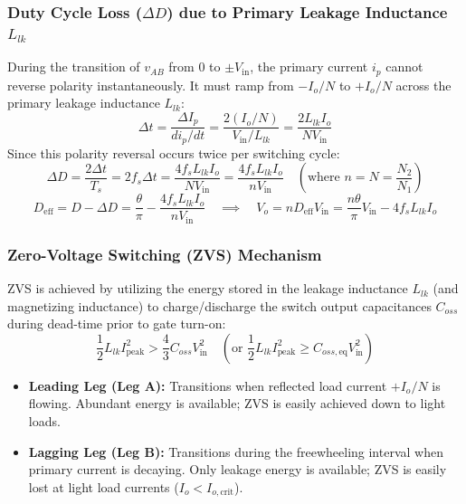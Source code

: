 \subsubsection{Duty Cycle Loss ($\Delta D$) due to Primary Leakage Inductance $L_{lk}$}
During the transition of $v_{AB}$ from $0$ to $\pm V_{\mathrm{in}}$, the primary current $i_p$ cannot reverse polarity instantaneously. It must ramp from $-I_o / N$ to $+I_o / N$ across the primary leakage inductance $L_{lk}$:
\[
\Delta t = \frac{\Delta I_p}{di_p/dt} = \frac{2 (I_o / N)}{V_{\mathrm{in}} / L_{lk}} = \frac{2 L_{lk} I_o}{N V_{\mathrm{in}}}
\]
Since this polarity reversal occurs twice per switching cycle:
\begin{equation}
\Delta D = \frac{2 \Delta t}{T_s} = 2 f_s \Delta t = \frac{4 f_s L_{lk} I_o}{N V_{\mathrm{in}}} = \frac{4 f_s L_{lk} I_o}{n V_{\mathrm{in}}} \quad \left(\text{where } n = N = \frac{N_2}{N_1}\right)
\end{equation}
\begin{equation}
D_{\mathrm{eff}} = D - \Delta D = \frac{\theta}{\pi} - \frac{4 f_s L_{lk} I_o}{n V_{\mathrm{in}}} \quad\implies\quad V_o = n D_{\mathrm{eff}} V_{\mathrm{in}} = \frac{n \theta}{\pi} V_{\mathrm{in}} - 4 f_s L_{lk} I_o
\end{equation}

\subsubsection{Zero-Voltage Switching (ZVS) Mechanism}
ZVS is achieved by utilizing the energy stored in the leakage inductance $L_{lk}$ (and magnetizing inductance) to charge/discharge the switch output capacitances $C_{oss}$ during dead-time prior to gate turn-on:
\begin{equation}
\frac{1}{2} L_{lk} I_{\mathrm{peak}}^2 > \frac{4}{3} C_{oss} V_{\mathrm{in}}^2 \quad \left(\text{or } \frac{1}{2} L_{lk} I_{\mathrm{peak}}^2 \ge C_{oss,\mathrm{eq}} V_{\mathrm{in}}^2\right)
\end{equation}
\begin{itemize}
  \item \textbf{Leading Leg (Leg A):} Transitions when reflected load current $+I_o/N$ is flowing. Abundant energy is available; ZVS is easily achieved down to light loads.
  \item \textbf{Lagging Leg (Leg B):} Transitions during the freewheeling interval when primary current is decaying. Only leakage energy is available; ZVS is easily lost at light load currents ($I_o < I_{o,\mathrm{crit}}$).
\end{itemize}

